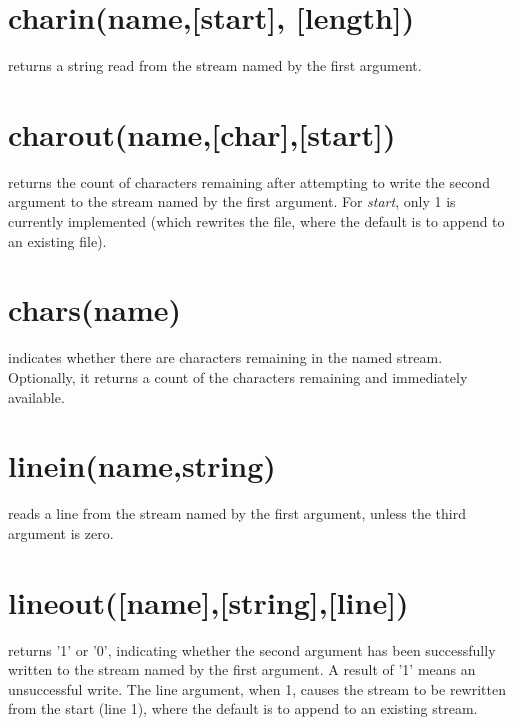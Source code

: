 \label{refrexxstream}


  
\section{charin(name,[start{]}, [length{]})} returns a string read from the stream named by the first
argument.
\section{charout(name,[char{]},[start{]})} returns the count of characters remaining after attempting to
write the second argument to the stream named by the first
argument. For \emph{start}, only 1 is currently implemented (which
rewrites the file, where the default is to append to an existing file). 
\section{chars(name)} indicates whether there are characters remaining in the named
stream. Optionally, it returns a count of the characters remaining and
immediately available.
\section{linein(name,string)} reads a line from the stream named by the first argument,
unless the third argument is zero.
\section{lineout([name{]},[string{]},[line{]})} returns '1' or '0', indicating whether the
  second argument has been successfully written to the stream named by
  the first argument. A result of '1' means an unsuccessful write. The
  line argument, when 1, causes the stream to be rewritten from the
  start (line 1), where the default is to append to an existing stream. 
